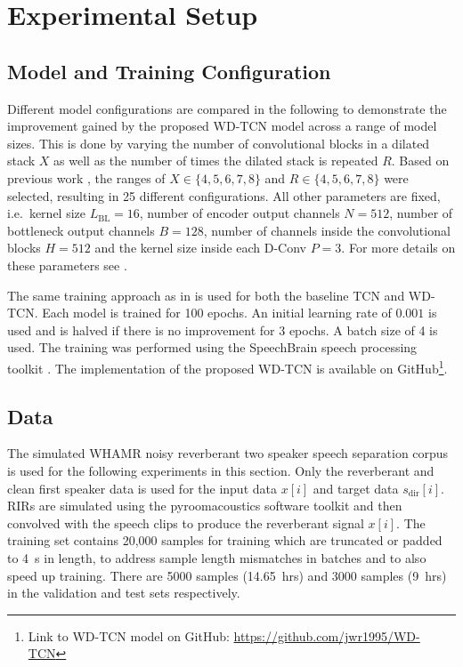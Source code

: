 \documentclass{article}
\begin{document}
\section{Experimental Setup}
\label{sec:exps}

\subsection{Model and Training Configuration}
Different model configurations are compared in the following to demonstrate the improvement gained by the proposed \ac{WD-TCN} model across a range of model sizes. This is done by varying the number of convolutional blocks in a dilated stack $X$ as well as the number of times the dilated stack is repeated $R$. Based on previous work \cite{rfield}, the ranges of $X\in\{4,5,6,7,8\}$ and $R\in\{4,5,6,7,8\}$ were selected, resulting in 25 different configurations. All other parameters are fixed, i.e.~kernel size $L_\mathrm{BL}=16$,  number of encoder output channels $N=512$, number of bottleneck output channels $B=128$, number of channels inside the convolutional blocks $H=512$ and the kernel size inside each \ac{D-Conv} $P=3$. For more details on these parameters see \cite{rfield,atttasnet,convtasnet}.

The same training approach as in \cite{rfield} is used for both the baseline \ac{TCN} and \ac{WD-TCN}. Each model is trained for 100 epochs. An initial learning rate of $0.001$ is used and is halved if there is no improvement for 3 epochs. A batch size of 4 is used.
The training was performed using the SpeechBrain speech processing toolkit \cite{speechbrain}. The implementation of the proposed \ac{WD-TCN} is available on GitHub\footnote{Link to \ac{WD-TCN} model on GitHub: \url{https://github.com/jwr1995/WD-TCN}}.
\subsection{Data}
The simulated WHAMR noisy reverberant two speaker speech separation corpus \cite{WHAMR} is used for the following experiments in this section. Only the reverberant and clean first speaker data is used for the input data $x[i]$ and target data $s_\mathrm{dir}[i]$. \Acp{RIR} are simulated using the pyroomacoustics software toolkit \cite{pyroomacoustics} and then convolved with the speech clips to produce the reverberant signal $x[i]$. The training set contains 20,000 samples for training which are truncated or padded to 4~s in length, to address sample length mismatches in batches and to also speed up training. There are 5000 samples (14.65~hrs) and 3000 samples (9~hrs) in the validation and test sets respectively.
\end{document}
